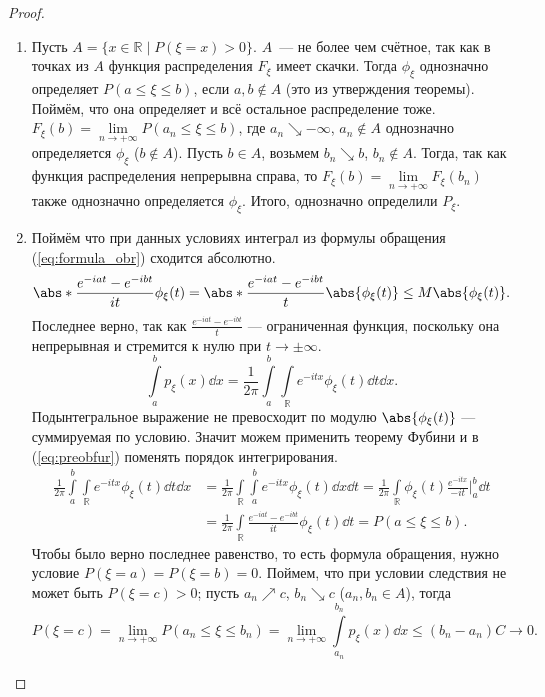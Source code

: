 \begin{proof}
\enewline
\begin{enumerate}
    \item Пусть $A= \{x\in\mathbb{R}\mid P(\xi = x) > 0\}$. $A$~--- не более чем счётное, так как в точках из $A$ функция распределения $F_\xi$ имеет скачки.
                   Тогда $\phi_\xi$ однозначно определяет $P(a\le\xi\le b)$, если $a, b\notin A$ (это из утверждения теоремы). Поймём, что она определяет и всё остальное распределение тоже.
                   $F_\xi(b) = \underset{n\rightarrow+\infty}{\lim} P(a_n\le\xi\le b)$,
                   где $a_n \searrow -\infty$, $a_n\notin A$ однозначно определяется $\phi_\xi$ ($b \notin A$).
                   Пусть $b\in A$, возьмем $b_n \searrow b$, $b_n \notin A$. Тогда, так как функция распределения непрерывна справа, то $F_\xi(b) = \underset{n\rightarrow+\infty}{\lim} F_\xi(b_n)$ также однозначно определяется $\phi_\xi$.
                   Итого, однозначно определили $P_\xi$.
    \item Поймём что при данных условиях интеграл из формулы обращения (\ref{eq:formula_obr}) сходится абсолютно. 
               $$\abs*{\frac{e^{-iat} - e^{-ibt}}{it}\phi_\xi(t)} = \abs*{\frac{e^{-iat} - e^{-ibt}}{t}}\abs{\phi_\xi(t)} \le M\abs{\phi_\xi(t)}.$$
                  Последнее верно, так как $\frac{e^{-iat} - e^{-ibt}}{t}$ --- ограниченная функция, поскольку она непрерывная и стремится к нулю при $t \to \pm\infty$.
\begin{equation*}\label{eq:preobfur} \tag{$\spadesuit$}
    \int\limits_a^b p_\xi(x)\dd x = \frac{1}{2\pi}\int\limits_a^b\int\limits_\mathbb{R}e^{-itx}\phi_\xi(t)\dd t\dd x.
\end{equation*}
    Подынтегральное выражение не превосходит по модулю $\abs{\phi_\xi(t)}$ --- суммируемая по условию. Значит можем применить теорему Фубини и в (\ref{eq:preobfur}) поменять порядок интегрирования.
    \begin{align*}
        \frac{1}{2\pi}\int\limits_a^b\int\limits_\mathbb{R}e^{-itx}\phi_\xi(t)\dd t\dd x &= \frac{1}{2\pi}\int\limits_\mathbb{R}\int\limits_a^b e^{-itx}\phi_\xi(t)\dd x\dd t = \frac{1}{2\pi}\int\limits_\mathbb{R}\phi_\xi(t) \frac{e^{-itx}}{-it}\Bigg|_a^b\dd t \\&=\frac{1}{2\pi}\int\limits_\mathbb{R}\frac{e^{-iat} - e^{-ibt}}{it}\phi_\xi(t)\dd t = P(a\le\xi\le b).
    \end{align*}
     Чтобы было верно последнее равенство, то есть формула обращения, нужно условие $P(\xi = a) = P(\xi = b) =0$. Поймем, что при условии следствия не может быть $P(\xi = c) > 0$; пусть $a_n\nearrow c$, $b_n\searrow c$ ($a_n, b_n \in A$), тогда
                   $$P(\xi = c) = \lim\limits_{n \to +\infty} P(a_n \le \xi\le b_n)  =
                       \lim\limits_{n \to +\infty} \int\limits_{a_n}^{b_n}p_\xi(x)\dd x \le (b_n-a_n)C \rightarrow 0.$$ \qedhere
\end{enumerate}
\end{proof}


